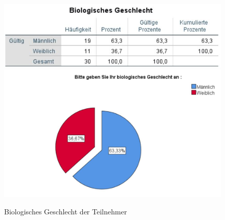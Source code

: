 \documentclass[a4paper,11pt]{article}%
\renewcommand{\\}{\vspace*{0.5\baselineskip} \newline}
\begin{document}
	\begin{figure}[H]
	\centering
		\begin{footnotesize}
			\includegraphics[scale=0.6]{Abbildungen/Pre_QuestionnaireStatistiks/teilnehmerGeschlecht}\\
			\includegraphics[scale=0.5]{Abbildungen/Demographie/teilnehmerGeschlecht}\\
			\caption{Biologisches Geschlecht der Teilnehmer}
			\label{fig:biologischesGeschlecht}
		\end{footnotesize}
	\end{figure}	
	
\end{document}

